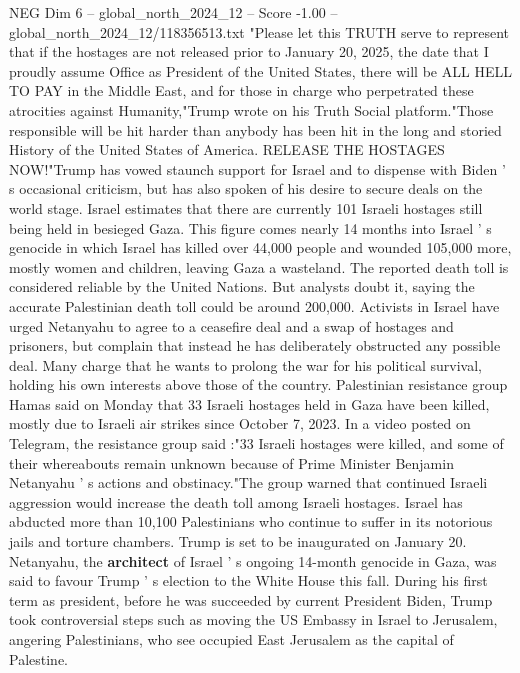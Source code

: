 \begin{textsample}{NEG Dim 6 – global\_north\_2024\_12 – Score -1.00 – global\_north\_2024\_12/118356513.txt}  \label{ex:f6_neg_179}
"Please let this TRUTH serve to represent that if the hostages are not released prior to January 20, 2025, the date that I proudly assume Office as President of the United States, there will be ALL HELL TO PAY in the Middle East, and for those in charge who perpetrated these atrocities against Humanity,"Trump wrote on his Truth Social platform."Those responsible will be hit harder than anybody has been hit in the long and storied History of the United States of America.
RELEASE THE HOSTAGES NOW!"Trump has vowed staunch support for Israel and to dispense with Biden ' s occasional criticism, but has also spoken of his desire to secure deals on the world stage.
Israel estimates that there are currently 101 Israeli hostages still being held in besieged Gaza.
This figure comes nearly 14 months into Israel ' s genocide in which Israel has killed over 44,000 people and wounded 105,000 more, mostly women and children, leaving Gaza a wasteland.
The reported death toll is considered reliable by the United Nations.
But analysts doubt it, saying the accurate Palestinian death toll could be around 200,000.
Activists in Israel have urged Netanyahu to agree to a ceasefire deal and a swap of hostages and prisoners, but complain that instead he has deliberately obstructed any possible deal.
Many charge that he wants to prolong the war for his political survival, holding his own interests above those of the country.
Palestinian resistance group Hamas said on Monday that 33 Israeli hostages held in Gaza have been killed, mostly due to Israeli air strikes since October 7, 2023.
In a video posted on Telegram, the resistance group said :"33 Israeli hostages were killed, and some of their whereabouts remain unknown because of Prime Minister Benjamin Netanyahu ' s actions and obstinacy."The group warned that continued Israeli aggression would increase the death toll among Israeli hostages.
Israel has abducted more than 10,100 Palestinians who continue to suffer in its notorious jails and torture chambers.
Trump is set to be inaugurated on January 20.
Netanyahu, the \textbf{architect} of Israel ' s ongoing 14-month genocide in Gaza, was said to favour Trump ' s election to the White House this fall.
During his first term as president, before he was succeeded by current President Biden, Trump took controversial steps such as moving the US Embassy in Israel to Jerusalem, angering Palestinians, who see occupied East Jerusalem as the capital of Palestine.

\end{textsample}
